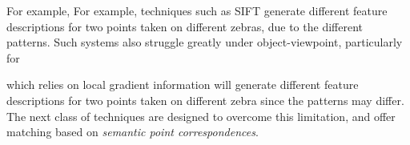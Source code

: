 For example, For example, techniques such as SIFT generate different feature descriptions for two points taken on different zebras, due to the different patterns. Such systems also struggle greatly under object-viewpoint, particularly for 

which relies on local gradient information will generate different feature descriptions for two points taken on different zebra since the patterns may differ. The next class of techniques are designed to overcome this limitation, and offer matching based on \emph{semantic point correspondences}.







